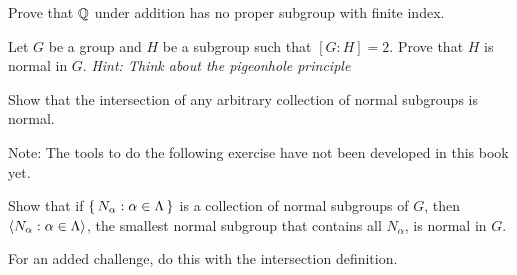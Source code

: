 \documentclass[./main.tex]{subfiles}
\begin{document}
\begin{exercise}
    Prove that $\mathbb{Q}$ under addition has no proper subgroup with finite index.
\end{exercise}

\begin{exercise}
\label{ex:index-2-subgroups-normal}
    Let $G$ be a group and $H$ be a subgroup such that $[G:H] = 2$. Prove that
    $H$ is normal in $G$. \textit{Hint: Think about the pigeonhole principle}
\end{exercise}

\begin{exercise}
    Show that the intersection of any arbitrary collection of normal subgroups
    is normal.
\end{exercise}


Note: The tools to do the following exercise have not been developed in this book yet. 
\begin{exercise}
    Show that if $\set{N_\alpha: \alpha \in \Lambda}$ is a collection of normal
    subgroups of $G$, then ${ \langle N_\alpha: \alpha \in \Lambda \rangle }$, the smallest
    normal subgroup that contains all $N_\alpha$, is normal in $G$.

    For an added challenge, do this with the intersection definition.
\end{exercise}
\end{document}
